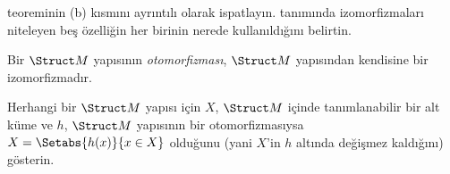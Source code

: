 \documentclass[../../../include/open-logic-section]{subfiles}
\begin{document}
\begin{prob}
 teoreminin (b) kısmını ayrıntılı olarak
ispatlayın.  tanımında
izomorfizmaları niteleyen beş özelliğin her birinin nerede
kullanıldığını belirtin.
\end{prob}

\begin{defn}
Bir $\Struct M$ yapısının \emph{otomorfizması}, $\Struct M$ yapısından
kendisine bir izomorfizmadır.
\end{defn}

\begin{prob}
Herhangi bir $\Struct M$ yapısı için $X$, $\Struct M$ içinde
tanımlanabilir bir alt küme ve $h$, $\Struct M$ yapısının bir
otomorfizmasıysa $X=\Setabs{h(x)}{x\in X}$ olduğunu (yani $X$'in $h$
altında değişmez kaldığını) gösterin.
\end{prob}
\end{document}
